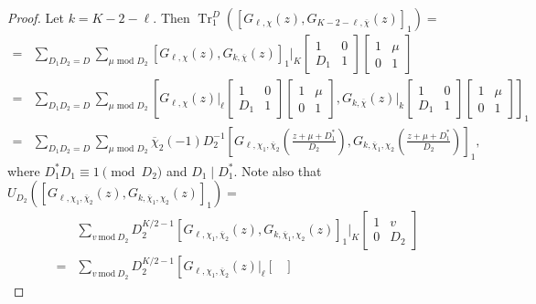 \documentclass[11pt,letterpaper,reqno]{amsart}
\numberwithin{figure}{section}
\numberwithin{table}{section}
\theoremstyle{definition}
\theoremstyle{plain}
\theoremstyle{definition}
\theoremstyle{definition}
\theoremstyle{remark}
\numberwithin{equation}{section}
\theoremstyle{remark}
\DeclareMathOperator{\Tr}{Tr}
\begin{document}
\begin{proof}
Let $k=K-2-\ell$. Then  $\Tr^D_1([G_{\ell,\chi}(z),G_{K-2-\ell,\overline{\chi}}(z)]_1)=$    
    \begin{align*}
        =&\sum_{D_1D_2=D}\sum_{\mu \text{ mod } D_2} \left[G_{\ell,\chi}(z),G_{k,\overline{\chi}}(z)\right]_1\bigg|_{K}\begin{bmatrix}
            1 & 0 \\ D_1 & 1
        \end{bmatrix}\begin{bmatrix}
            1 & \mu \\ 0 & 1
        \end{bmatrix} \\
        =&\sum_{D_1D_2=D}\sum_{\mu \text{ mod } D_2}\left[G_{\ell,\chi}(z)\bigg|_{\ell}\begin{bmatrix}
            1 & 0 \\ D_1 & 1
\end{bmatrix}\begin{bmatrix}
            1 & \mu \\ 0 & 1
        \end{bmatrix},G_{k,\overline{\chi}}(z)\bigg|_{k}\begin{bmatrix}
            1 & 0 \\ D_1 & 1
        \end{bmatrix}\begin{bmatrix}
            1 & \mu \\ 0 & 1
        \end{bmatrix}\right]_1 \\
        =&\sum_{D_1D_2=D}\sum_{\mu \text{ mod } D_2}\overline{\chi}_2(-1)D_2^{-1}\left[G_{\ell,\chi_1,\overline{\chi}_{2}}\left(\frac{z+\mu+D_1^*}{D_2}\right),G_{k,\overline{\chi}_{1},\chi_2}\left(\frac{z+\mu+D_1^*}{D_2}\right)\right]_1,
    \end{align*}
    where $D_1^{\ast}D_1\equiv1\pmod{D_2}$ and $D_1\mid D_1^{\ast}$.
Note also that $U_{D_2}\left([G_{\ell,\chi_1,\overline{\chi}_{2}}(z),G_{k,\overline{\chi}_{1},\chi_2}(z)]_1\right)=  $
     \begin{align*}
     &\sum_{v~\text{mod}~D_2}D_2^{K/2-1}[G_{\ell,\chi_1,\overline{\chi}_{2}}(z),G_{k,\overline{\chi}_{1},\chi_2}(z)]_1\bigg|_{K}\begin{bmatrix}
            1 & v\\ 0 & D_2
    \end{bmatrix}\\=&\sum_{v~\text{mod}~D_2}D_2^{K/2-1}\left[G_{\ell,\chi_1,\overline{\chi}_{2}}(z)\bigg|_{\ell}\begin{bmatrix}

\end{bmatrix}
\end{align*}
\end{proof}
\end{document}
